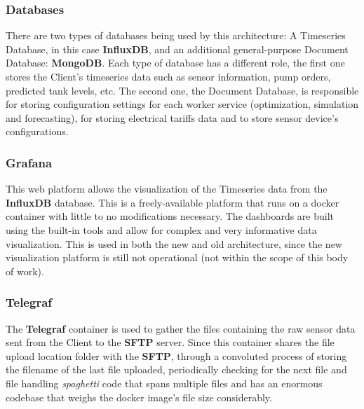 


\subsubsection{Databases}
\label{methodology:sss:databases}

There are two types of databases being used by this architecture: A Timeseries Database, in this case \textbf{InfluxDB}, and an additional general-purpose Document Database: \textbf{MongoDB}. Each type of database has a different role, the first one stores the Client's timeseries data such as sensor information, pump orders, predicted tank levels, etc.
The second one, the Document Database, is responsible for storing configuration settings for each worker service (optimization, simulation and forecasting), for storing electrical tariffs data and to store sensor device's configurations.

\subsubsection{Grafana}
\label{methodology:sss:grafana}

This web platform allows the visualization of the Timeseries data from the \textbf{InfluxDB} database. This is a freely-available platform that runs on a docker container with little to no modifications necessary. The dashboards are built using the built-in tools and allow for complex and very informative data visualization. This is used in both the new and old architecture, since the new visualization platform is still not operational (not within the scope of this body of work).

\subsubsection{Telegraf}
\label{methodology:sss:telegraf}

The \textbf{Telegraf} container is used to gather the files containing the raw sensor data sent from the Client to the \textbf{SFTP} server. Since this container shares the file upload location folder with the \textbf{SFTP}, through a convoluted process of storing the filename of the last file uploaded, periodically checking for the next file and file handling \textit{spaghetti} code that spans multiple files and has an enormous codebase that weighs the docker image's file size considerably. 